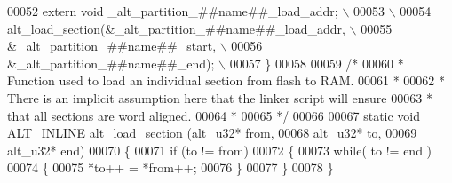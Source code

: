\begin{DoxyCode}
00052 \textcolor{preprocessor}{    extern void \_alt\_partition\_##name##\_load\_addr;             \(\backslash\)}
00053 \textcolor{preprocessor}{                                                               \(\backslash\)}
00054 \textcolor{preprocessor}{    alt\_load\_section(&\_alt\_partition\_##name##\_load\_addr,       \(\backslash\)}
00055 \textcolor{preprocessor}{                     &\_alt\_partition\_##name##\_start,           \(\backslash\)}
00056 \textcolor{preprocessor}{                     &\_alt\_partition\_##name##\_end);            \(\backslash\)}
00057 \textcolor{preprocessor}{  \}}
00058 
00059 \textcolor{comment}{/*}
00060 \textcolor{comment}{ * Function used to load an individual section from flash to RAM.}
00061 \textcolor{comment}{ *}
00062 \textcolor{comment}{ * There is an implicit assumption here that the linker script will ensure}
00063 \textcolor{comment}{ * that all sections are word aligned.}
00064 \textcolor{comment}{ *}
00065 \textcolor{comment}{ */}
00066 
00067 \textcolor{keyword}{static} \textcolor{keywordtype}{void} ALT_INLINE alt_load_section (alt_u32* from, 
00068                                          alt_u32* to, 
00069                                          alt_u32* end)
00070 \{
00071   \textcolor{keywordflow}{if} (to != from)
00072   \{
00073     \textcolor{keywordflow}{while}( to != end )
00074     \{
00075       *to++ = *from++;
00076     \}
00077   \}
00078 \}
\end{DoxyCode}
